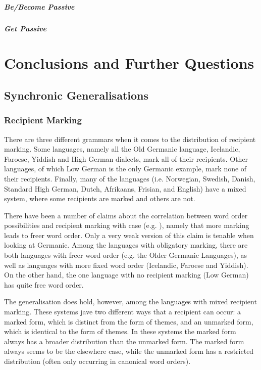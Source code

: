 \subsubsection{Be/Become Passive}
\subsubsection{Get Passive}

\part{Conclusions and Further Questions}\label{Conc}
\chapter{Synchronic Generalisations}\label{chap:synchgen}
\section{Recipient Marking}
There are three different grammars when it comes to the distribution of recipient marking. Some languages, namely all the Old Germanic language, Icelandic, Faroese, Yiddish and High German dialects, mark all of their recipients. Other languages, of which Low German is the only Germanic example, mark none of their recipients. Finally, many of the languages (i.e. Norwegian, Swedish, Danish, Standard High German, Dutch, Afrikaans, Frisian, and English) have a mixed system, where some recipients are marked and others are not. 

There have been a number of claims about the correlation between word order possibilities and recipient marking with case (e.g. \cite{Weerman.1997}), namely that more marking leads to freer word order. Only a very weak version of this claim is tenable when looking at Germanic. Among the languages with obligatory marking, there are both languages with freer word order (e.g. the Older Germanic Languages), as well as languages with more fixed word order (Icelandic, Faroese and Yiddish). On the other hand, the one language with no recipient marking (Low German) has quite free word order. 

The generalisation does hold, however, among the languages with mixed recipient marking. These systems jave two different ways that a recipient can occur: a marked form, which is distinct from the form of themes, and an unmarked form, which is identical to the form of themes. In these systems the marked form always has a broader distribution than the unmarked form. The marked form always seems to be the elsewhere case, while the unmarked form has a restricted distribution (often only occurring in canonical word orders).


